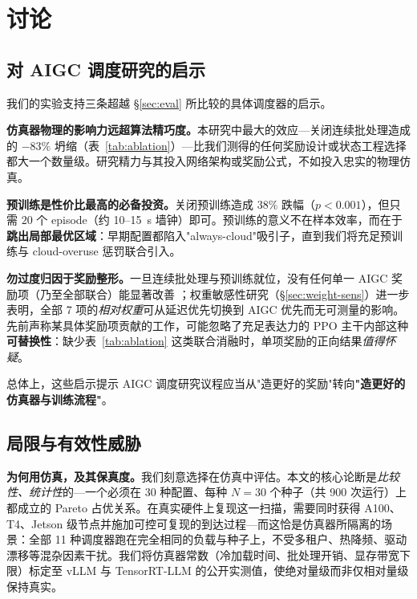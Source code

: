 \section{讨论}
\label{sec:discuss}

\subsection{对 AIGC 调度研究的启示}
\label{sec:implications}

我们的实验支持三条超越 \S\ref{sec:eval} 所比较的具体调度器的启示。

\textbf{仿真器物理的影响力远超算法精巧度。}本研究中最大的效应---关闭连续批处理造成的 $-83\%$ \slo{} 坍缩（表~\ref{tab:ablation}）---比我们测得的任何奖励设计或状态工程选择都大一个数量级。研究精力与其投入网络架构或奖励公式，不如投入忠实的物理仿真。

\textbf{预训练是性价比最高的必备投资。}关闭预训练造成 $38\%$ \slo{} 跌幅（$p<0.001$），但只需 $20$ 个 episode（约 10--15~s 墙钟）即可。预训练的意义不在样本效率，而在于\textbf{跳出局部最优区域}：早期配置都陷入"always-cloud"吸引子，直到我们将充足预训练与 cloud-overuse 惩罚联合引入。

\textbf{勿过度归因于奖励整形。}一旦连续批处理与预训练就位，没有任何单一 AIGC 奖励项（乃至全部联合）能显著改善 \slo{}；权重敏感性研究（\S\ref{sec:weight-sens}）进一步表明，全部 7 项的\emph{相对权重}可从延迟优先切换到 AIGC 优先而无可测量的影响。先前声称某具体奖励项贡献的工作，可能忽略了充足表达力的 PPO 主干内部这种\textbf{可替换性}：缺少表~\ref{tab:ablation} 这类联合消融时，单项奖励的正向结果\emph{值得怀疑}。

总体上，这些启示提示 AIGC 调度研究议程应当从"造更好的奖励"转向\textbf{"造更好的仿真器与训练流程"}。

\subsection{局限与有效性威胁}
\label{sec:limitations}

\textbf{为何用仿真，及其保真度。}我们刻意选择在仿真中评估。本文的核心论断是\emph{比较性、统计性}的---一个必须在 30 种配置、每种 $N{=}30$ 个种子（共 900 次运行）上都成立的 Pareto 占优关系。在真实硬件上复现这一扫描，需要同时获得 A100、T4、Jetson 级节点并施加可控可复现的到达过程---而这恰是仿真器所隔离的场景：全部 11 种调度器跑在完全相同的负载与种子上，不受多租户、热降频、驱动漂移等混杂因素干扰。我们将仿真器常数（冷加载时间、批处理开销、显存带宽下限）标定至 vLLM 与 TensorRT-LLM 的公开实测值，使绝对量级而非仅相对量级保持真实。

